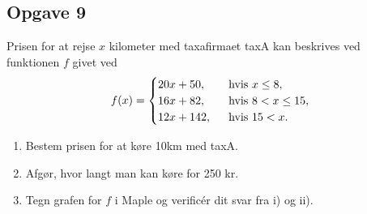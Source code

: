 \subsection*{Opgave 9}
Prisen for at rejse $x$ kilometer med taxafirmaet taxA kan beskrives ved funktionen $f$ givet ved
\begin{align*}
	f(x) =
	\begin{cases}
		20x + 50, \ &\textnormal{ hvis } x \leq 8, \\
		16x + 82, \ &\textnormal{ hvis } 8 < x \leq 15, \\
		12x + 142, \ &\textnormal{ hvis } 15 < x.
	\end{cases}
\end{align*}

\begin{enumerate}[label = \roman*)]
	\item Bestem prisen for at køre 10km med taxA.
	\item Afgør, hvor langt man kan køre for 250 kr.
	\item Tegn grafen for $f$ i Maple og verificér dit svar fra i) og ii).
\end{enumerate}

